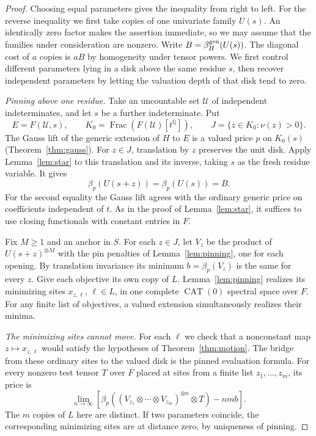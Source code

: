 \begin{proof}
Choosing equal parameters gives the inequality from right to left.
For the reverse inequality we first take copies of one univariate
family $U(s)$. An identically zero factor makes the assertion immediate,
so we may assume that the families under consideration are nonzero.
Write $B=\beta_H^{\rm gen}(U(s))$. The diagonal cost of $a$ copies is
$aB$ by homogeneity under tensor powers. We first control different
parameters lying in a disk above the same residue $s$, then recover
independent parameters by letting the valuation depth of that disk
tend to zero.

\smallskip\noindent\emph{Pinning above one residue.}
Take an uncountable set $\mathcal U$ of independent indeterminates,
and let $s$ be a further indeterminate. Put
\[
 E=F(\mathcal U,s),\qquad
 K_0=\operatorname{Frac}(F(\mathcal U)[t^{\mathbb Q}]),\qquad
 J=\{z\in K_0:\nu(z)>0\}.
\]
The Gauss lift of the generic extension of $H$ to $E$ is a valued price
$p$ on $K_0(s)$ (Theorem~\ref{thm:gauss}). For $z\in J$, translation
by $z$ preserves the unit disk. Apply Lemma~\ref{lem:star} to this
translation and its inverse, taking $s$ as the fresh residue variable.
It gives
\begin{equation}\label{eq:sync-disk-single}
     \beta_p(U(s+z))=\beta_p(U(s))=B .
\end{equation}
For the second equality the Gauss lift agrees with the ordinary
generic price on coefficients independent of $t$. As in the proof of
Lemma~\ref{lem:star}, it suffices to use closing functionals with
constant entries in $F$.

Fix $M\ge1$ and an anchor in $S$. For each $z\in J$, let $V_z$ be the
product of $U(s+z)^{\otimes M}$ with the pin penalties of
Lemma~\ref{lem:pinning}, one for each opening. By translation invariance
its minimum $b=\beta_p(V_z)$ is the same for every $z$. Give each
objective its own copy of $L$. Lemma~\ref{lem:pinning} realizes its minimizing
sites $x_{z,\ell}$, $\ell\in L$, in one complete $\operatorname{CAT}(0)$
spectral space over $F$. For any finite list of objectives, a valued
extension simultaneously realizes their minima.

\smallskip\noindent\emph{The minimizing sites cannot move.}
For each $\ell$ we check that a nonconstant map $z\mapsto x_{z,\ell}$
would satisfy the hypotheses of Theorem~\ref{thm:motion}. The bridge
from these ordinary sites to the valued disk is the pinned evaluation
formula. For every nonzero test tensor $T$ over $F$ placed at sites
from a finite list $z_1,\ldots,z_m$, its price is
\begin{equation}\label{eq:sync-pinned-prices}
 \lim_{n\to\infty}
 \left[
 \beta_p\!\left(
  (V_{z_1}\otimes\cdots\otimes V_{z_m})^{\otimes n}\otimes T
 \right)-nmb
 \right].
\end{equation}
The $m$ copies of $L$ here are distinct. If two parameters coincide,
the corresponding minimizing sites are at distance zero, by uniqueness
of pinning.


\end{proof}
